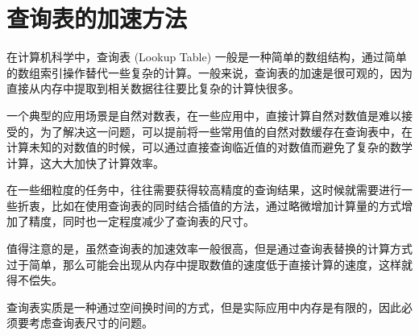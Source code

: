 \section{查询表的加速方法}
在计算机科学中，查询表 (Lookup Table) 一般是一种简单的数组结构，通过简单的数组索引操作替代一些复杂的计算。一般来说，查询表的加速是很可观的，因为直接从内存中提取到相关数据往往要比复杂的计算快很多。

一个典型的应用场景是自然对数表，在一些应用中，直接计算自然对数值是难以接受的，为了解决这一问题，可以提前将一些常用值的自然对数缓存在查询表中，在计算未知的对数值的时候，可以通过直接查询临近值的对数值而避免了复杂的数学计算，这大大加快了计算效率。


在一些细粒度的任务中，往往需要获得较高精度的查询结果，这时候就需要进行一些折衷，比如在使用查询表的同时结合插值的方法，通过略微增加计算量的方式增加了精度，同时也一定程度减少了查询表的尺寸。


值得注意的是，虽然查询表的加速效率一般很高，但是通过查询表替换的计算方式过于简单，那么可能会出现从内存中提取数值的速度低于直接计算的速度，这样就得不偿失。

查询表实质是一种通过空间换时间的方式，但是实际应用中内存是有限的，因此必须要考虑查询表尺寸的问题。


